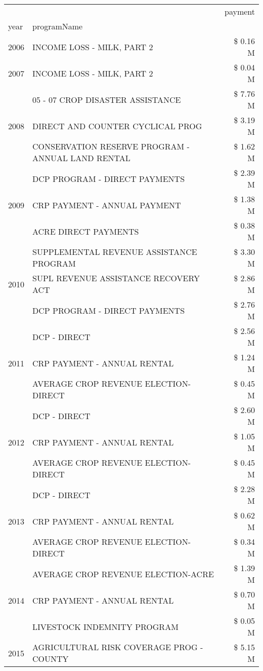 \begin{tabular}{llr}
\toprule
 &  & payment \\
year & programName &  \\
\midrule
2006 & INCOME LOSS - MILK, PART 2 & \$ 0.16 M \\
\cline{1-3}
2007 & INCOME LOSS - MILK, PART 2 & \$ 0.04 M \\
\cline{1-3}
\multirow[t]{3}{*}{2008} & 05 - 07 CROP DISASTER ASSISTANCE & \$ 7.76 M \\
 & DIRECT AND COUNTER CYCLICAL PROG & \$ 3.19 M \\
 & CONSERVATION RESERVE PROGRAM - ANNUAL LAND RENTAL & \$ 1.62 M \\
\cline{1-3}
\multirow[t]{3}{*}{2009} & DCP PROGRAM - DIRECT PAYMENTS & \$ 2.39 M \\
 & CRP PAYMENT - ANNUAL PAYMENT & \$ 1.38 M \\
 & ACRE DIRECT PAYMENTS & \$ 0.38 M \\
\cline{1-3}
\multirow[t]{3}{*}{2010} & SUPPLEMENTAL REVENUE ASSISTANCE PROGRAM & \$ 3.30 M \\
 & SUPL REVENUE ASSISTANCE RECOVERY ACT & \$ 2.86 M \\
 & DCP PROGRAM - DIRECT PAYMENTS & \$ 2.76 M \\
\cline{1-3}
\multirow[t]{3}{*}{2011} & DCP - DIRECT & \$ 2.56 M \\
 & CRP PAYMENT - ANNUAL RENTAL & \$ 1.24 M \\
 & AVERAGE CROP REVENUE ELECTION-DIRECT & \$ 0.45 M \\
\cline{1-3}
\multirow[t]{3}{*}{2012} & DCP - DIRECT & \$ 2.60 M \\
 & CRP PAYMENT - ANNUAL RENTAL & \$ 1.05 M \\
 & AVERAGE CROP REVENUE ELECTION-DIRECT & \$ 0.45 M \\
\cline{1-3}
\multirow[t]{3}{*}{2013} & DCP - DIRECT & \$ 2.28 M \\
 & CRP PAYMENT - ANNUAL RENTAL & \$ 0.62 M \\
 & AVERAGE CROP REVENUE ELECTION-DIRECT & \$ 0.34 M \\
\cline{1-3}
\multirow[t]{3}{*}{2014} & AVERAGE CROP REVENUE ELECTION-ACRE & \$ 1.39 M \\
 & CRP PAYMENT - ANNUAL RENTAL & \$ 0.70 M \\
 & LIVESTOCK INDEMNITY PROGRAM & \$ 0.05 M \\
\cline{1-3}
\multirow[t]{3}{*}{2015} & AGRICULTURAL RISK COVERAGE PROG - COUNTY & \$ 5.15 M \\

\end{tabular}
